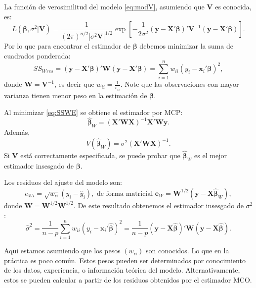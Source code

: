 \documentclass[
]{article}
\begin{document}
La función de verosimilitud del modelo \eqref{eq:modV}, asumiendo que \(\boldsymbol V\) es conocida, es:
\[
L(\boldsymbol \beta,\sigma^{2} | \boldsymbol V) =  \frac{1}{(2\pi)^{n/2}|\sigma^{2}\boldsymbol V|^{1/2}}\exp \left[-\frac{1}{2\sigma^{2}}(\boldsymbol y- \boldsymbol X'\boldsymbol \beta)'\boldsymbol V^{-1}(\boldsymbol y- \boldsymbol X'\boldsymbol \beta) \right].
\]
Por lo que para encontrar el estimador de \(\boldsymbol \beta\) debemos minimizar la suma de cuadrados ponderada:
\begin{equation}
SS_{Wres} = (\boldsymbol y- \boldsymbol X'\boldsymbol \beta)'\boldsymbol W(\boldsymbol y- \boldsymbol X'\boldsymbol \beta) = \sum_{i=1}^{n} w_{ii}(y_{i} - \boldsymbol x_{i}'\boldsymbol \beta)^{2},
\label{eq:SSWE}
\end{equation}
donde \(\boldsymbol W= \boldsymbol V^{-1}\), es decir que \(w_{ii}= \frac{1}{v_{ii}}\). Note que las observaciones con mayor varianza tienen menor peso en la estimación de \(\boldsymbol \beta\).

Al minimizar \eqref{eq:SSWE} se obtiene el estimador por MCP:
\[
\widehat{\boldsymbol \beta}_{W} = (\boldsymbol X'\boldsymbol W\boldsymbol X)^{-1}\boldsymbol X'\boldsymbol W\boldsymbol y.
\]
Además,
\begin{equation}
V(\widehat{\boldsymbol \beta}_{W}) = \sigma^{2}(\boldsymbol X'\boldsymbol W\boldsymbol X)^{-1}.
\label{eq:VarBetaW}
\end{equation}
Si \(\boldsymbol V\) está correctamente especificada, se puede probar que \(\widehat{\boldsymbol \beta}_{W}\) es el mejor estimador insesgado de \(\boldsymbol \beta\).

Los residuos del ajuste del modelo son:
\[
e_{Wi} = \sqrt{w_{ii}}(y_{i} - \widehat{y}_{i}), \mbox{ de forma matricial }\boldsymbol e_{W} = \boldsymbol W^{1/2}(\boldsymbol y- \boldsymbol X\widehat{\boldsymbol \beta}_{W}),
\]
donde \(\boldsymbol W= \boldsymbol W^{1/2}\boldsymbol W^{1/2}\). De este resultado obtenemos el estimador insesgado de \(\sigma^{2}\):
\[
\widehat{\sigma}^{2} = \frac{1}{n-p}\sum_{i=1}^{n}w_{ii}(y_{i}-\boldsymbol x_{i}'\widehat{\boldsymbol \beta})^{2} = \frac{1}{n-p}(\boldsymbol y- \boldsymbol X\widehat{\boldsymbol \beta})'\boldsymbol W(\boldsymbol y- \boldsymbol X\widehat{\boldsymbol \beta}).
\]

Aqui estamos asumiendo que los pesos \((w_{ii})\) son conocidos. Lo que en la práctica es poco común. Estos pesos pueden ser determinados por conocimiento de los datos, experiencia, o información teórica del modelo. Alternativamente, estos se pueden calcular a partir de los residuos obtenidos por el estimador MCO.
\end{document}
